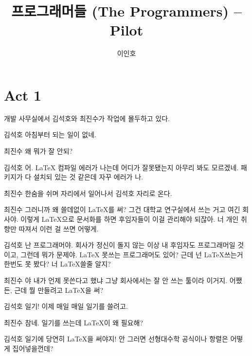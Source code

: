 \documentclass{screenplay}
\title{프로그래머들 (The Programmers) -- Pilot}
\author{이인호}
\begin{document}
    \coverpage
    
    \section*{Act 1}
    
    \fadein
    개발 사무실에서 김석호와 최진수가 작업에 몰두하고 있다. 
    \begin{dialogue}[짜증 내는 말투로]{김석호}
        아침부터 되는 일이 없네.
    \end{dialogue}
    \begin{dialogue}{최진수}
        왜 뭐가 잘 안되?
    \end{dialogue}
    \begin{dialogue}{김석호}
        어. LaTeX 컴파일 에러가 나는데 어디가 잘못됐는지 아무리 봐도 모르겠네. 패키지가 다 설치되 있는 것 같은데 자꾸 에러가 나. 
    \end{dialogue}
    최진수 한숨을 쉬며 자리에서 일어나서 김석호 자리로 온다.
    \begin{dialogue}[어이없다는 듯이]{최진수}
        그러니까 왜 쓸데없이 LaTeX를 써? 그건 대학교 연구실에서 쓰는 거고 여긴 회사야. 이렇게 LaTeX으로 문서화를 하면 후임자들이 이걸 관리해야 되잖아. 너 개인 취향만 따져서 이런 걸 쓰면 어떻게. 
    \end{dialogue}
    \begin{dialogue}[반색하며]{김석호}
        난 프로그래머야. 회사가 정신이 돌지 않는 이상 내 후임자도 프로그래머일 것이고, 그런데 뭐가 문제야. LaTeX 못쓰는 프로그래머도 있어?
        근데 넌 LaTeX쓰는거 한번도 못 봤다? 너 LaTeX쓸줄 알지?
    \end{dialogue}
    \begin{dialogue}{최진수}
        야 내가 언제 못쓴다고 했냐 그냥 회사에서는 잘 안 쓰는 툴이라 이거지.
        어쨌든, 근데 뭘 만들려고 LaTeX을 써?
    \end{dialogue}
    \begin{dialogue}[웃으며]{김석호}
        일기! 이제 매일 매일 일기를 쓸려고.
    \end{dialogue}
    \begin{dialogue}[황당하다는 듯이]{최진수}
        참네. 일기를 쓰는데 LaTeX이 왜 필요해?
    \end{dialogue}
    \begin{dialogue}[순진하게]{김석호}
        일기에 당연히 LaTeX을 써야지! 안 그러면 선형대수학 공식이나 항렬은 어떻게 집어넣을껀데?
    \end{dialogue}
\end{document}
